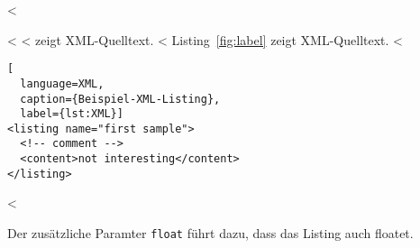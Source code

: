<%

<%
<%
 zeigt XML-Quelltext.
<%
Listing~\ref{fig:label} zeigt XML-Quelltext.
<%

\begin{lstlisting}[
  language=XML,
  caption={Beispiel-XML-Listing},
  label={lst:XML}]
<listing name="first sample">
  <!-- comment -->
  <content>not interesting</content>
</listing>
\end{lstlisting}
<%

Der zusätzliche Paramter \verb+float+ führt dazu, dass das Listing auch floatet.
